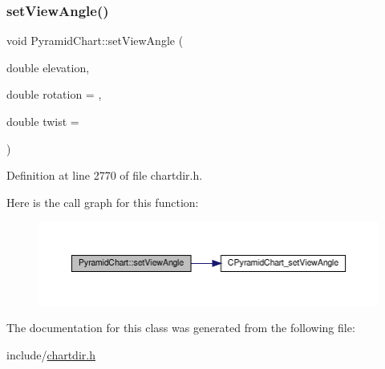 \subsubsection{\texorpdfstring{set\+View\+Angle()}{setViewAngle()}}
{\footnotesize\ttfamily void Pyramid\+Chart\+::set\+View\+Angle (\begin{DoxyParamCaption}\item[{double}]{elevation,  }\item[{double}]{rotation = {},  }\item[{double}]{twist = {} }\end{DoxyParamCaption})\hspace{0.3cm}{\ttfamily [inline]}}



Definition at line 2770 of file chartdir.\+h.

Here is the call graph for this function\+:
\nopagebreak
\begin{figure}[H]
\begin{center}
\leavevmode
\includegraphics[width=350pt]{class_pyramid_chart_ac3dc9f4fac7f8ac89c6d2aa41af9542e_cgraph}
\end{center}
\end{figure}


The documentation for this class was generated from the following file\+:\begin{DoxyCompactItemize}
\item 
include/\hyperlink{chartdir_8h}{chartdir.\+h}\end{DoxyCompactItemize}
